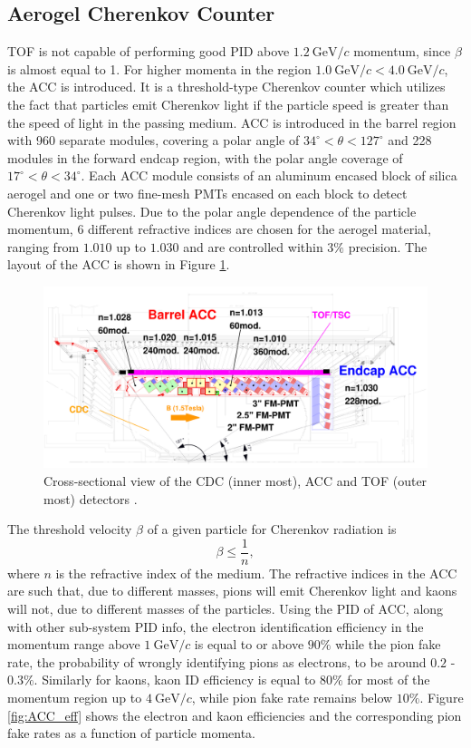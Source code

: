 \documentclass[headings=standardclasses,headings=big,oneside,a4paper,openany,12pt]{scrbook}
\newcommand {\e}[1]{\mathrm{~#1}}
\begin{document}
\subsection{Aerogel Cherenkov Counter}
TOF is not capable of performing good PID above $1.2\e{GeV}/c$ momentum, since $\beta$ is almost equal to 1. For higher momenta in the region $1.0\e{GeV}/c < 4.0\e{GeV}/c$, the ACC is introduced. It is a threshold-type Cherenkov counter which utilizes the fact that particles emit Cherenkov light if the particle speed is greater than the speed of light in the passing medium. ACC is introduced in the barrel region with 960 separate modules, covering a polar angle of $34^\circ < \theta < 127^\circ$ and 228 modules in the forward endcap region, with the polar angle coverage of $17^\circ < \theta < 34^\circ$. Each ACC module consists of an aluminum encased block of silica aerogel and one or two fine-mesh PMTs encased on each block to detect Cherenkov light pulses. Due to the polar angle dependence of the particle momentum, 6 different refractive indices are chosen for the aerogel material, ranging from $1.010$ up to $1.030$ and are controlled within $3\%$ precision. The layout of the ACC is shown in Figure \ref{fig:ACC_layout}.
\begin{figure}[H]
	\centering
	\captionsetup{width=0.8\linewidth}
	\includegraphics[width=\linewidth]{fig/setup/ACC_layout}
	\caption{Cross-sectional view of the CDC (inner most), ACC and TOF (outer most) detectors \cite{ABASHIAN2002117}.}
	\label{fig:ACC_layout}
\end{figure}
The threshold velocity $\beta$ of a given particle for Cherenkov radiation is
\begin{equation}
\beta \leq \frac{1}{n},
\end{equation}
where $n$ is the refractive index of the medium. The refractive indices in the ACC are such that, due to different masses, pions will emit Cherenkov light and kaons will not, due to different masses of the particles. Using the PID of ACC, along with other sub-system PID info, the electron identification efficiency in the momentum range above $1\e{GeV}/c$ is equal to or above $90\%$ while the pion fake rate, the probability of wrongly identifying pions as electrons, to be around $0.2$ - $0.3\%$. Similarly for kaons, kaon ID efficiency is equal to $80\%$ for most of the momentum region up to $4\e{GeV}/c$, while pion fake rate remains below $10\%$. Figure \ref{fig:ACC_eff} shows the electron and kaon efficiencies and the corresponding pion fake rates as a function of particle momenta.
\end{document}
